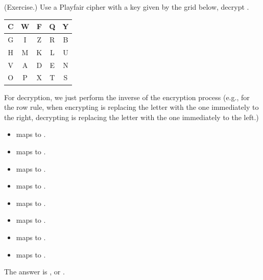 \documentclass[letterpaper]{article}
\begin{document}
\begin{mdframed}
    (Exercise.) Use a Playfair cipher with a key given by the grid below, decrypt .
    \begin{center}
        \begin{tabular}{|c|c|c|c|c|}
            \hline
            C & W & F & Q & Y \\ 
            \hline
            G & I & Z & R & B \\ 
            \hline
            H & M & K & L & U \\ 
            \hline
            V & A & D & E & N \\ 
            \hline
            O & P & X & T & S \\ 
            \hline
        \end{tabular}
    \end{center}

    \begin{mdframed}
        For decryption, we just perform the inverse of the encryption process (e.g., for the row rule, when encrypting is replacing the letter with the one immediately to the right, decrypting is replacing the letter with the one immediately to the left.)
        \begin{itemize}
            \item {} maps to .
            \item {} maps to .
            \item {} maps to .
            \item {} maps to .
            \item {} maps to .
            \item {} maps to .
            \item {} maps to .
            \item {} maps to .
        \end{itemize}
        The answer is , or .
    \end{mdframed}
\end{mdframed}
\end{document}

